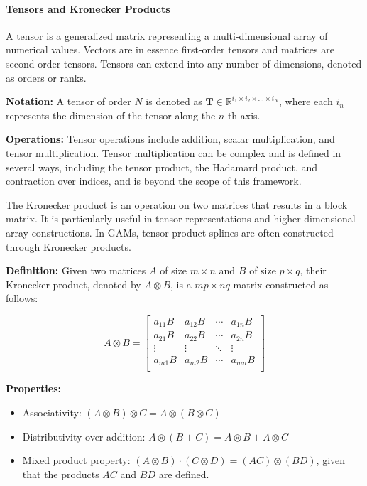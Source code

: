 \documentclass[12pt, twoside,hidelinks]{article}
\theoremstyle{definition}
\numberwithin{equation}{section}
\begin{document}
\paragraph{Tensors and Kronecker Products}

A tensor is a generalized matrix representing a multi-dimensional array of numerical values. Vectors are in essence first-order tensors and matrices are second-order tensors. Tensors can extend into any number of dimensions, denoted as orders or ranks. 

\textbf{Notation:} A tensor of order $N$ is denoted as $\mathbf{T} \in \mathbb{R}^{i_1 \times i_2 \times \ldots \times i_N}$, where each $i_n$ represents the dimension of the tensor along the $n$-th axis.

\textbf{Operations:} Tensor operations include addition, scalar multiplication, and tensor multiplication. Tensor multiplication can be complex and is defined in several ways, including the tensor product, the Hadamard product, and contraction over indices, and is beyond the scope of this framework.

The Kronecker product is an operation on two matrices that results in a block matrix. It is particularly useful in tensor representations and higher-dimensional array constructions. In GAMs, tensor product splines are often constructed through Kronecker products.

\textbf{Definition:} Given two matrices $A$ of size $m \times n$ and $B$ of size $p \times q$, their Kronecker product, denoted by $A \otimes B$, is a $mp \times nq$ matrix constructed as follows:

\[
A \otimes B = \left[ \begin{array}{cccc}
a_{11}B & a_{12}B & \cdots & a_{1n}B \\
a_{21}B & a_{22}B & \cdots & a_{2n}B \\
\vdots & \vdots & \ddots & \vdots \\
a_{m1}B & a_{m2}B & \cdots & a_{mn}B \\
\end{array} \right]
\]

\textbf{Properties:}
\begin{itemize}
    \item Associativity: $(A \otimes B) \otimes C = A \otimes (B \otimes C)$
    \item Distributivity over addition: $A \otimes (B+C) = A \otimes B + A \otimes C$
    \item Mixed product property: $(A \otimes B) \cdot (C \otimes D) = (AC) \otimes (BD)$, given that the products $AC$ and $BD$ are defined.
\end{itemize}
\end{document}
